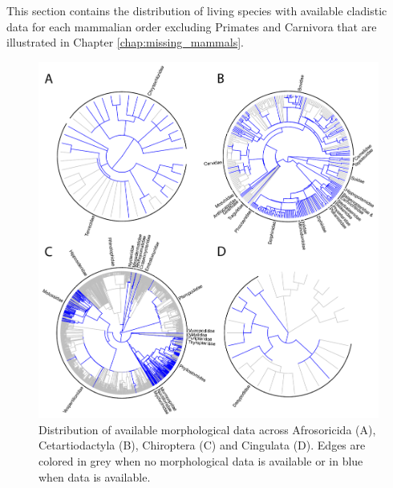 This section contains the distribution of living species with available cladistic data for each mammalian order excluding Primates and Carnivora that are illustrated in Chapter \ref{chap:missing_mammals}.

\begin{figure}[!ht]
\centering
    \includegraphics[width=\textwidth]{Supplementaries/Figures/MissingMammals/Combined_phy1.pdf}
\caption[Available data in Afrosoricida, Cetartiodactyla, Chiroptera and Dasyuromorphia]{Distribution of available morphological data across Afrosoricida (A), Cetartiodactyla (B), Chiroptera (C) and Cingulata (D). Edges are colored in grey when no morphological data is available or in blue when data is available.}
\label{Supp_combined_phy1}
\end{figure}

